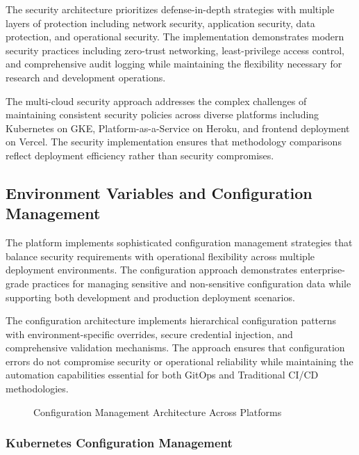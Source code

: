 The security architecture prioritizes defense-in-depth strategies with multiple layers of protection including network security, application security, data protection, and operational security. The implementation demonstrates modern security practices including zero-trust networking, least-privilege access control, and comprehensive audit logging while maintaining the flexibility necessary for research and development operations.

The multi-cloud security approach addresses the complex challenges of maintaining consistent security policies across diverse platforms including Kubernetes on GKE, Platform-as-a-Service on Heroku, and frontend deployment on Vercel. The security implementation ensures that methodology comparisons reflect deployment efficiency rather than security compromises.

\subsection{Environment Variables and Configuration Management}

The platform implements sophisticated configuration management strategies that balance security requirements with operational flexibility across multiple deployment environments. The configuration approach demonstrates enterprise-grade practices for managing sensitive and non-sensitive configuration data while supporting both development and production deployment scenarios.

The configuration architecture implements hierarchical configuration patterns with environment-specific overrides, secure credential injection, and comprehensive validation mechanisms. The approach ensures that configuration errors do not compromise security or operational reliability while maintaining the automation capabilities essential for both GitOps and Traditional CI/CD methodologies.

\begin{figure}[H]
\centering
\caption{Configuration Management Architecture Across Platforms}
\label{fig:configuration-management-architecture}
\end{figure}

\subsubsection{Kubernetes Configuration Management}

